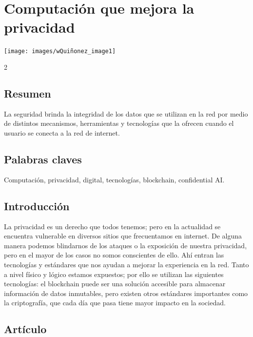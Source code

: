 \documentclass[12pt,spanish,Letterpaper,openany]{book}
\begin{document}
\hypertarget{widvin}{%
\chapter{Computación que mejora la privacidad}\label{widvin}}

\begin{center}\texttt{[image: images/wQuiñonez\_image1]} \end{center}

\begin {multicols}{2}

\hypertarget{resumen-8}{%
\section{Resumen}\label{resumen-8}}

La seguridad brinda la integridad de los datos que se utilizan en la red por medio de distintos mecanismos, herramientas y tecnologías que la ofrecen cuando el usuario se conecta a la red de internet.

\hypertarget{palabras-claves-8}{%
\section{Palabras claves}\label{palabras-claves-8}}

Computación, privacidad, digital, tecnologías, blockchain, confidential AI.

\hypertarget{introducciuxf3n-8}{%
\section{Introducción}\label{introducciuxf3n-8}}

La privacidad es un derecho que todos tenemos; pero en la actualidad se encuentra vulnerable en diversos sitios que frecuentamos en internet. De alguna manera podemos blindarnos de los ataques o la exposición de nuestra privacidad, pero en el mayor de los casos no somos conscientes de ello. Ahí entran las tecnologías y estándares que nos ayudan a mejorar la experiencia en la red. Tanto a nivel físico y lógico estamos expuestos; por ello se utilizan las siguientes tecnologías: el blockchain puede ser una solución accesible para almacenar información de datos inmutables, pero existen otros estándares importantes como la criptografía, que cada día que pasa tiene mayor impacto en la sociedad.

\hypertarget{artuxedculo-8}{%
\section{Artículo}\label{artuxedculo-8}}


\end{multicols}
\end{document}

